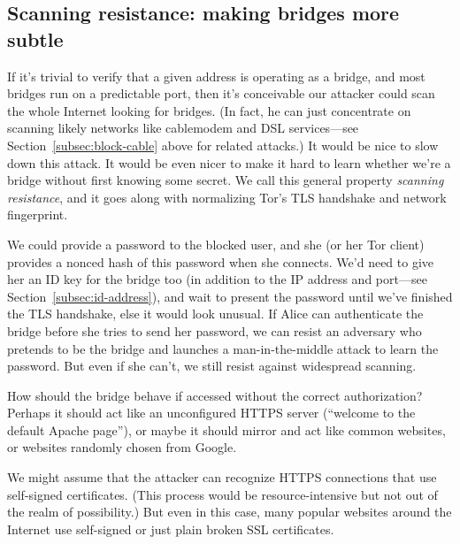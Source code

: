 \documentclass{llncs}
\begin{document}
\subsection{Scanning resistance: making bridges more subtle}

If it's trivial to verify that a given address is operating as a bridge,
and most bridges run on a predictable port, then it's conceivable our
attacker could scan the whole Internet looking for bridges. (In fact,
he can just concentrate on scanning likely networks like cablemodem
and DSL services---see Section~\ref{subsec:block-cable} above for
related attacks.) It would be nice to slow down this attack. It would
be even nicer to make it hard to learn whether we're a bridge without
first knowing some secret. We call this general property \emph{scanning
resistance}, and it goes along with normalizing Tor's TLS handshake and
network fingerprint.

We could provide a password to the blocked user, and she (or her Tor
client) provides a nonced hash of this password when she connects. We'd
need to give her an ID key for the bridge too (in addition to the IP
address and port---see Section~\ref{subsec:id-address}), and wait to
present the password until we've finished the TLS handshake, else it
would look unusual. If Alice can authenticate the bridge before she
tries to send her password, we can resist an adversary who pretends
to be the bridge and launches a man-in-the-middle attack to learn the
password. But even if she can't, we still resist against widespread
scanning.

How should the bridge behave if accessed without the correct
authorization? Perhaps it should act like an unconfigured HTTPS server
(``welcome to the default Apache page''), or maybe it should mirror
and act like common websites, or websites randomly chosen from Google.

We might assume that the attacker can recognize HTTPS connections that
use self-signed certificates. (This process would be resource-intensive
but not out of the realm of possibility.) But even in this case, many
popular websites around the Internet use self-signed or just plain broken
SSL certificates.

\end{document}
